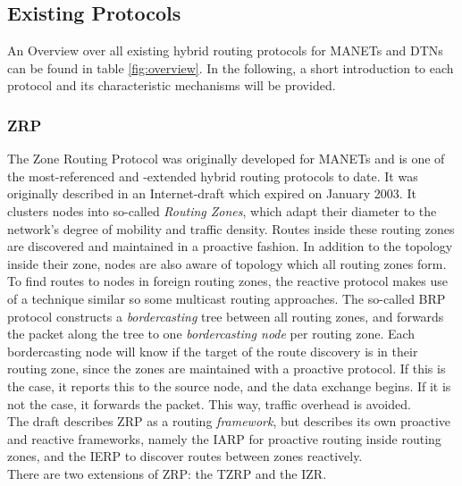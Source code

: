 \documentclass[a4paper,10pt]{scrartcl}
\begin{document}
\subsection{Existing Protocols}
\label{subsec:existing_protocols}
An Overview over all existing hybrid routing protocols for \glspl{MANET} and \glspl{DTN}
can be found in table \ref{fig:overview}. In the following, a short introduction to each protocol and its characteristic mechanisms will be provided.

\subsubsection{\gls{ZRP}}
\label{subsec:sharp}
The Zone Routing Protocol was originally developed for \glspl{MANET} and is one of the most-referenced and -extended hybrid routing protocols to date. It was originally described in an Internet-draft which expired on January 2003\cite{ZRP-Draft}.
It clusters nodes into so-called \emph{Routing Zones}, which adapt their diameter to the network's degree of mobility and traffic density. Routes inside these routing zones are discovered and maintained in a proactive fashion. In addition to the topology inside their zone, nodes are also aware of topology which all routing zones form.
To find routes to nodes in foreign routing zones, the reactive protocol makes use of a technique similar so some multicast routing approaches. The so-called \gls{BRP}\cite{draft-ietf-manet-zone-brp} protocol constructs a \emph{bordercasting} tree between all routing zones, and forwards the packet along the tree to one \emph{bordercasting node} per routing zone. Each bordercasting node will know if the target of the route discovery is in their routing zone, since the zones are maintained with a proactive protocol. If this is the case, it reports this to the source node, and the data exchange begins. If it is not the case, it forwards the packet. This way, traffic overhead is avoided.\\
The draft describes ZRP as a routing \emph{framework}, but describes its own proactive and reactive frameworks, namely the \gls{IARP}\cite{draft-ietf-manet-zone-iarp} for proactive routing inside routing zones, and the \gls{IERP}\cite{draft-ietf-manet-zone-ierp} to discover routes between zones reactively.\\
There are two extensions of ZRP: the \gls{TZRP}\cite{TZRP} and the \gls{IZR}\cite{IZR}. 
\end{document}
